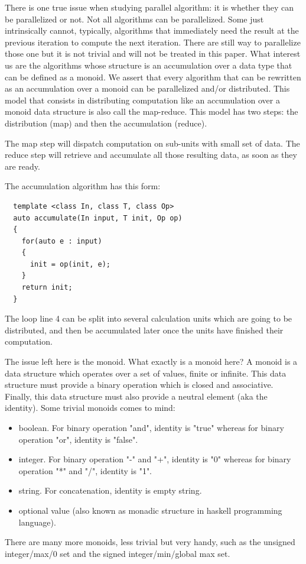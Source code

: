 There is one true issue when studying parallel algorithm: it is whether they can be parallelized or not. Not all
algorithms can be parallelized. Some just intrinsically cannot, typically, algorithms that immediately need the result
at the previous iteration to compute the next iteration. There are still way to parallelize those one but it is not
trivial and will not be treated in this paper. What interest us are the algorithms whose structure is an accumulation
over a data type that can be defined as a monoid. We assert that every algorithm that can be rewritten as an
accumulation over a monoid can be parallelized and/or distributed. This model that consists in distributing computation
like an accumulation over a monoid data structure is also call the map-reduce. This model has two steps: the
distribution (map) and then the accumulation (reduce).

The map step will dispatch computation on sub-units with small set of data. The reduce step will retrieve and accumulate
all those resulting data, as soon as they are ready.

The accumulation algorithm has this form:
\begin{verbatim}
  template <class In, class T, class Op>
  auto accumulate(In input, T init, Op op)
  {
    for(auto e : input)
    {
      init = op(init, e);
    }
    return init;
  }
\end{verbatim}

The loop line 4 can be split into several calculation units which are going to be distributed, and then be accumulated
later once the units have finished their computation.

The issue left here is the monoid. What exactly is a monoid here? A monoid is a data structure which operates over a set
of values, finite or infinite. This data structure must provide a binary operation which is closed and associative.
Finally, this data structure must also provide a neutral element (aka the identity). Some trivial monoids comes to mind:
\begin{itemize}
  \item boolean. For binary operation "and", identity is "true" whereas for binary operation "or", identity is "false".
  \item integer. For binary operation "-" and "+", identity is "0" whereas for binary operation "*" and "/", identity is
        "1".
  \item string. For concatenation, identity is empty string.
  \item optional value (also known as monadic structure in haskell programming language).
\end{itemize}
There are many more monoids, less trivial but very handy, such as the unsigned integer/max/0 set and the signed
integer/min/global max set.

